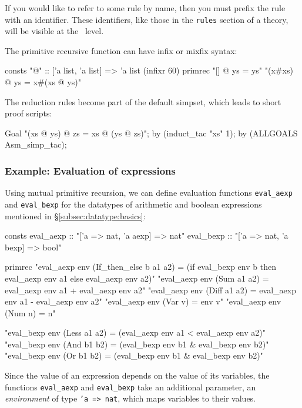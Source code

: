If you would like to refer to some rule by name, then you must prefix
the rule with an identifier.  These identifiers, like those in the
\texttt{rules} section of a theory, will be visible at the \ML\ level.

The primitive recursive function can have infix or mixfix syntax:
\begin{ttbox}\underscoreon
consts "@"  :: ['a list, 'a list] => 'a list  (infixr 60)
primrec
   "[] @ ys = ys"
   "(x#xs) @ ys = x#(xs @ ys)"
\end{ttbox}

The reduction rules become part of the default simpset, which
leads to short proof scripts:
\begin{ttbox}\underscoreon
Goal "(xs @ ys) @ zs = xs @ (ys @ zs)";
by (induct\_tac "xs" 1);
by (ALLGOALS Asm\_simp\_tac);
\end{ttbox}

\subsubsection{Example: Evaluation of expressions}
Using mutual primitive recursion, we can define evaluation functions \texttt{eval_aexp}
and \texttt{eval_bexp} for the datatypes of arithmetic and boolean expressions mentioned in
\S\ref{subsec:datatype:basics}:
\begin{ttbox}
consts
  eval_aexp :: "['a => nat, 'a aexp] => nat"
  eval_bexp :: "['a => nat, 'a bexp] => bool"

primrec
  "eval_aexp env (If_then_else b a1 a2) =
     (if eval_bexp env b then eval_aexp env a1 else eval_aexp env a2)"
  "eval_aexp env (Sum a1 a2) = eval_aexp env a1 + eval_aexp env a2"
  "eval_aexp env (Diff a1 a2) = eval_aexp env a1 - eval_aexp env a2"
  "eval_aexp env (Var v) = env v"
  "eval_aexp env (Num n) = n"

  "eval_bexp env (Less a1 a2) = (eval_aexp env a1 < eval_aexp env a2)"
  "eval_bexp env (And b1 b2) = (eval_bexp env b1 & eval_bexp env b2)"
  "eval_bexp env (Or b1 b2) = (eval_bexp env b1 & eval_bexp env b2)"
\end{ttbox}
Since the value of an expression depends on the value of its variables,
the functions \texttt{eval_aexp} and \texttt{eval_bexp} take an additional
parameter, an {\em environment} of type \texttt{'a => nat}, which maps
variables to their values.

